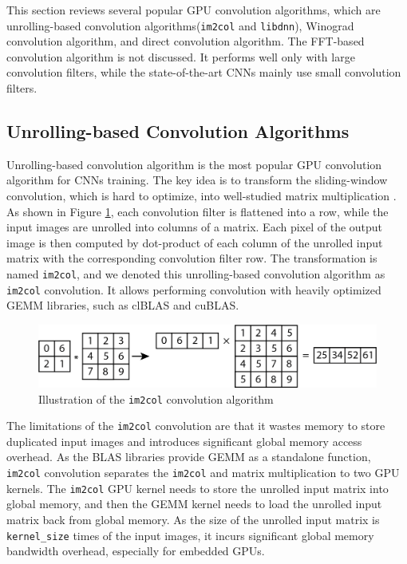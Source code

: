 \documentclass{article}
\begin{document}
This section reviews several popular GPU convolution algorithms, which are unrolling-based convolution algorithms(\texttt{im2col} and \texttt{libdnn}), Winograd convolution algorithm, and direct convolution algorithm. The FFT-based convolution algorithm is not discussed. It performs well only with large convolution filters, while the state-of-the-art CNNs mainly use small convolution filters.


\subsection{Unrolling-based Convolution Algorithms}

Unrolling-based convolution algorithm is the most popular GPU convolution algorithm for CNNs training. The key idea is to transform the sliding-window convolution, which is hard to optimize, into well-studied matrix multiplication \cite{im2col}. As shown in Figure \ref{im2col}, each convolution filter is flattened into a row, while the input images are unrolled into columns of a matrix. Each pixel of the output image is then computed by dot-product of each column of the unrolled input matrix with the corresponding convolution filter row. The transformation is named \texttt{im2col}, and we denoted this unrolling-based convolution algorithm as \texttt{im2col} convolution. It allows performing convolution with heavily optimized GEMM libraries, such as clBLAS and cuBLAS.

\begin{figure}[h!]
\centering

\includegraphics[width=0.8\linewidth]{im2col.png}

\caption{Illustration of the \texttt{im2col} convolution algorithm \label{im2col}}

\end{figure}

The limitations of the \texttt{im2col} convolution are that it wastes memory to store duplicated input images and introduces significant global memory access overhead. As the BLAS libraries provide GEMM as a standalone function, \texttt{im2col} convolution separates the \texttt{im2col} and matrix multiplication to two GPU kernels. The \texttt{im2col} GPU kernel needs to store the unrolled input matrix into global memory, and then the GEMM kernel needs to load the unrolled input matrix back from global memory. As the size of the unrolled input matrix is \texttt{kernel\_size} times of the input images, it incurs significant global memory bandwidth overhead, especially for embedded GPUs.
\end{document}
